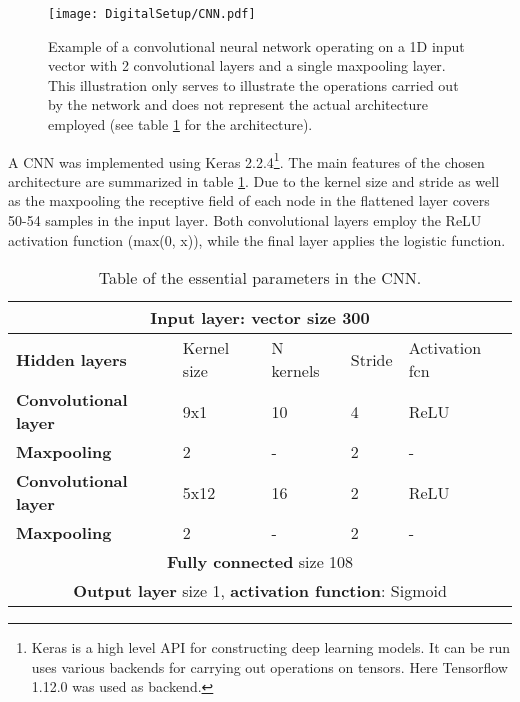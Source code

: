 \documentclass[main.tex]{subfiles}
\begin{document}
\begin{figure}[ht!]
    \centering
        \texttt{[image: DigitalSetup/CNN.pdf]}
        \caption[]{Example of a convolutional neural network operating on a 1D input vector with 2 convolutional layers and a single maxpooling layer. This illustration only serves to illustrate the operations carried out by the network and does not represent the actual architecture employed (see table \ref{tab:architecture} for the architecture).}
    \label{fig:CNN} 
\end{figure}

A CNN was implemented using Keras 2.2.4\footnote{Keras is a high level API for constructing deep learning models. It can be run uses various backends for carrying out operations on tensors. Here Tensorflow 1.12.0 was used as backend.}\cite{keras}. The main features of the chosen architecture are summarized in table \ref{tab:architecture}. Due to the kernel size and stride as well as the maxpooling the receptive field of each node in the flattened layer covers 50-54 samples in the input layer. Both convolutional layers employ the ReLU activation function (max(0, x)), while the final layer applies the logistic function.
\begin{table}[h]
\center
\begin{tabular}{|l|l|l|l|l|}
\hline
\multicolumn{5}{|c|}{\textbf{Input layer}: vector size 300}                                            \\ \hline
\textbf{Hidden layers}       & Kernel size & N kernels & Stride & Activation fcn \\ \hline
\textbf{Convolutional layer} & 9x1           & 10                & 4             & ReLU                \\ \hline
\textbf{Maxpooling}          & 2           & -                 & 2             & -                   \\ \hline
\textbf{Convolutional layer} & 5x12           & 16                & 2             & ReLU                \\ \hline
\textbf{Maxpooling}          & 2           & -                 & 2             & -                   \\ \hline
\multicolumn{5}{|c|}{\textbf{Fully connected} size 108}
\\ \hline
\multicolumn{5}{|c|}{\textbf{Output layer} size 1, \textbf{activation function}: Sigmoid}               \\ \hline
\end{tabular}
\caption{Table of the essential parameters in the CNN.}
\label{tab:architecture}
\end{table}
\end{document}
